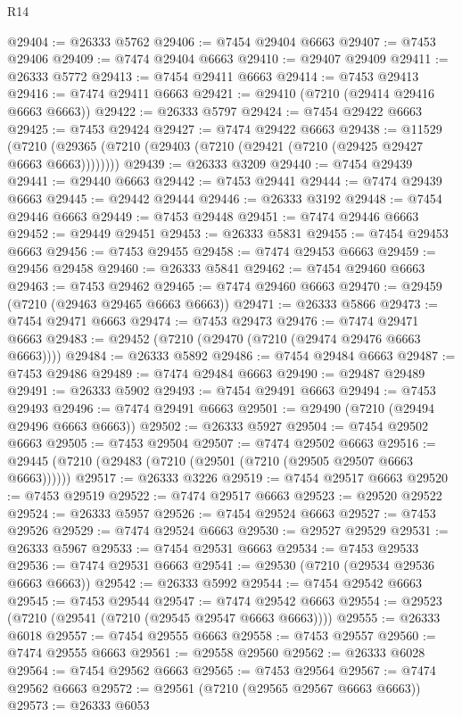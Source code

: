 \begin{lexlean}{R14}
\begin{coremodule}
@29404 := @26333 @5762
@29406 := @7454 @29404 @6663
@29407 := @7453 @29406
@29409 := @7474 @29404 @6663
@29410 := @29407 @29409
@29411 := @26333 @5772
@29413 := @7454 @29411 @6663
@29414 := @7453 @29413
@29416 := @7474 @29411 @6663
@29421 := @29410 (@7210 (@29414 @29416 @6663 @6663))
@29422 := @26333 @5797
@29424 := @7454 @29422 @6663
@29425 := @7453 @29424
@29427 := @7474 @29422 @6663
@29438 := @11529
    (@7210 (@29365 (@7210 (@29403 (@7210 (@29421 (@7210 (@29425 @29427 @6663 @6663))))))))
@29439 := @26333 @3209
@29440 := @7454 @29439
@29441 := @29440 @6663
@29442 := @7453 @29441
@29444 := @7474 @29439 @6663
@29445 := @29442 @29444
@29446 := @26333 @3192
@29448 := @7454 @29446 @6663
@29449 := @7453 @29448
@29451 := @7474 @29446 @6663
@29452 := @29449 @29451
@29453 := @26333 @5831
@29455 := @7454 @29453 @6663
@29456 := @7453 @29455
@29458 := @7474 @29453 @6663
@29459 := @29456 @29458
@29460 := @26333 @5841
@29462 := @7454 @29460 @6663
@29463 := @7453 @29462
@29465 := @7474 @29460 @6663
@29470 := @29459 (@7210 (@29463 @29465 @6663 @6663))
@29471 := @26333 @5866
@29473 := @7454 @29471 @6663
@29474 := @7453 @29473
@29476 := @7474 @29471 @6663
@29483 := @29452 (@7210 (@29470 (@7210 (@29474 @29476 @6663 @6663))))
@29484 := @26333 @5892
@29486 := @7454 @29484 @6663
@29487 := @7453 @29486
@29489 := @7474 @29484 @6663
@29490 := @29487 @29489
@29491 := @26333 @5902
@29493 := @7454 @29491 @6663
@29494 := @7453 @29493
@29496 := @7474 @29491 @6663
@29501 := @29490 (@7210 (@29494 @29496 @6663 @6663))
@29502 := @26333 @5927
@29504 := @7454 @29502 @6663
@29505 := @7453 @29504
@29507 := @7474 @29502 @6663
@29516 := @29445 (@7210 (@29483 (@7210 (@29501 (@7210 (@29505 @29507 @6663 @6663))))))
@29517 := @26333 @3226
@29519 := @7454 @29517 @6663
@29520 := @7453 @29519
@29522 := @7474 @29517 @6663
@29523 := @29520 @29522
@29524 := @26333 @5957
@29526 := @7454 @29524 @6663
@29527 := @7453 @29526
@29529 := @7474 @29524 @6663
@29530 := @29527 @29529
@29531 := @26333 @5967
@29533 := @7454 @29531 @6663
@29534 := @7453 @29533
@29536 := @7474 @29531 @6663
@29541 := @29530 (@7210 (@29534 @29536 @6663 @6663))
@29542 := @26333 @5992
@29544 := @7454 @29542 @6663
@29545 := @7453 @29544
@29547 := @7474 @29542 @6663
@29554 := @29523 (@7210 (@29541 (@7210 (@29545 @29547 @6663 @6663))))
@29555 := @26333 @6018
@29557 := @7454 @29555 @6663
@29558 := @7453 @29557
@29560 := @7474 @29555 @6663
@29561 := @29558 @29560
@29562 := @26333 @6028
@29564 := @7454 @29562 @6663
@29565 := @7453 @29564
@29567 := @7474 @29562 @6663
@29572 := @29561 (@7210 (@29565 @29567 @6663 @6663))
@29573 := @26333 @6053

\end{coremodule}
\end{lexlean}
